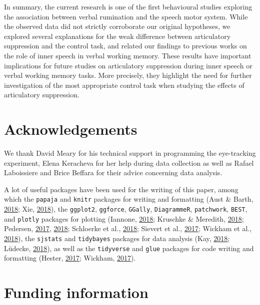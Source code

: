 \documentclass[a4paper,12pt,twoside,onecolumn,openright,final,oldfontcommands]{memoir}
\begin{document}
In summary, the current research is one of the first behavioural studies exploring the association between verbal rumination and the speech motor system. While the observed data did not strictly corroborate our original hypotheses, we explored several explanations for the weak difference between articulatory suppression and the control task, and related our findings to previous works on the role of inner speech in verbal working memory. These results have important implications for future studies on articulatory suppression during inner speech or verbal working memory tasks. More precisely, they highlight the need for further investigation of the most appropriate control task when studying the effects of articulatory suppression.

\hypertarget{acknowledgements-3}{%
\section{Acknowledgements}\label{acknowledgements-3}}

We thank David Meary for his technical support in programming the eye-tracking experiment, Elena Keracheva for her help during data collection as well as Rafael Laboissiere and Brice Beffara for their advice concerning data analysis.

A lot of useful packages have been used for the writing of this paper, among which the \texttt{papaja} and \texttt{knitr} packages for writing and formatting (Aust \& Barth, \protect\hyperlink{ref-R-papaja}{2018}; Xie, \protect\hyperlink{ref-R-knitr}{2018}), the \texttt{ggplot2}, \texttt{ggforce}, \texttt{GGally}, \texttt{DiagrammeR}, \texttt{patchwork}, \texttt{BEST}, and \texttt{plotly} packages for plotting (Iannone, \protect\hyperlink{ref-R-DiagrammeR}{2018}; Kruschke \& Meredith, \protect\hyperlink{ref-R-BEST}{2018}; Pedersen, \protect\hyperlink{ref-R-patchwork}{2017}, \protect\hyperlink{ref-R-ggforce}{2018}; Schloerke et al., \protect\hyperlink{ref-R-GGally}{2018}; Sievert et al., \protect\hyperlink{ref-R-plotly}{2017}; Wickham et al., \protect\hyperlink{ref-R-ggplot2}{2018}), the \texttt{sjstats} and \texttt{tidybayes} packages for data analysis (Kay, \protect\hyperlink{ref-R-tidybayes}{2018}; Lüdecke, \protect\hyperlink{ref-R-sjstats}{2018}), as well as the \texttt{tidyverse} and \texttt{glue} packages for code writing and formatting (Hester, \protect\hyperlink{ref-R-glue}{2017}; Wickham, \protect\hyperlink{ref-R-tidyverse}{2017}).

\hypertarget{funding-information}{%
\section{Funding information}\label{funding-information}}
\end{document}
